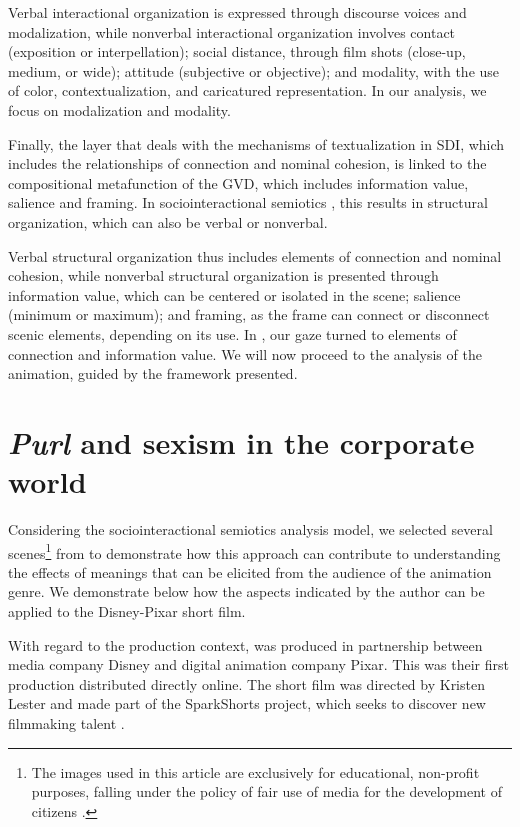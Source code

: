 \documentclass[english]{textolivre}
\begin{document}
Verbal interactional organization is expressed through discourse voices and modalization, while nonverbal interactional organization involves contact (exposition or interpellation); social distance, through film shots (close-up, medium, or wide); attitude (subjective or objective); and modality, with the use of color, contextualization, and caricatured representation. In our analysis, we focus on modalization and modality.

Finally, the layer that deals with the mechanisms of textualization in SDI, which includes the relationships of connection and nominal cohesion, is linked to the compositional metafunction of the GVD, which includes information value, salience and framing. In sociointeractional semiotics \cite{leal2011organizaccao}, this results in structural organization, which can also be verbal or nonverbal.

Verbal structural organization thus includes elements of connection and nominal cohesion, while nonverbal structural organization is presented through information value, which can be centered or isolated in the scene; salience (minimum or maximum); and framing, as the frame can connect or disconnect scenic elements, depending on its use. In \textcite{purl}, our gaze turned to elements of connection and information value. We will now proceed to the analysis of the animation, guided by the framework presented. 


\section{\emph{Purl} and sexism in the corporate world}

Considering the sociointeractional semiotics analysis model, we selected several scenes\footnote{The images used in this article are exclusively for educational, non-profit purposes, falling under the policy of fair use of media for the development of citizens \cite{brasil2009, youtube}.} from \textcite{purl} to demonstrate how this approach can contribute to understanding the effects of meanings that can be elicited from the audience of the animation genre. We demonstrate below how the aspects indicated by the author can be applied to the Disney-Pixar short film. 

With regard to the production context, \textcite{purl} was produced in partnership between media company Disney and digital animation company Pixar. This was their first production distributed directly online. The short film was directed by Kristen Lester and made part of the SparkShorts project, which seeks to discover new filmmaking talent \cite{penzani2019}. 
\end{document}
